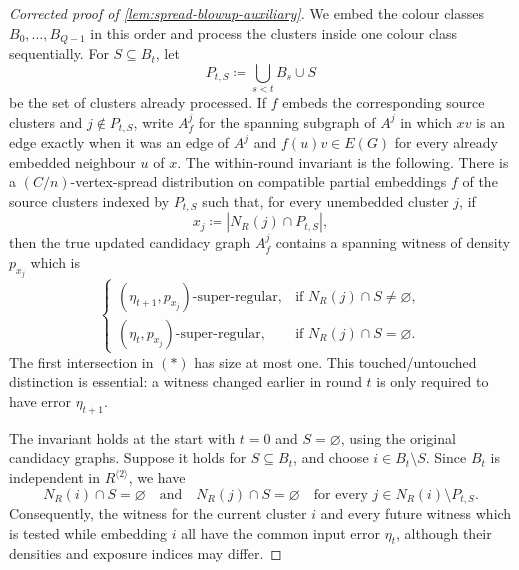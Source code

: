 \begin{proof}[Corrected proof of \cref{lem:spread-blowup-auxiliary}]
We embed the colour classes $B_0,\dots,B_{Q-1}$ in this order and process the
clusters inside one colour class sequentially.  For
$S\subseteq B_t$, let
\[
    P_{t,S}
        \coloneqq \bigcup_{s<t}B_s\cup S
\]
be the set of clusters already processed.  If $f$ embeds the corresponding
source clusters and $j\notin P_{t,S}$, write $A_f^j$ for the spanning
subgraph of $A^j$ in which $xv$ is an edge exactly when it was an edge of
$A^j$ and $f(u)v\in E(G)$ for every already embedded neighbour $u$ of $x$.
The within-round invariant is the following.  There is a
$(C/n)$-vertex-spread distribution on compatible
partial embeddings $f$ of the source clusters indexed by $P_{t,S}$ such that,
for every unembedded cluster $j$, if
\[
    x_j\coloneqq |N_R(j)\cap P_{t,S}|,
\]
then the true updated candidacy graph $A_f^j$ contains a spanning witness of
density $p_{x_j}$ which is
\[
    \begin{cases}
      (\eta_{t+1},p_{x_j})\text{-super-regular},
        &\text{if }N_R(j)\cap S\neq\varnothing,\\
      (\eta_t,p_{x_j})\text{-super-regular},
        &\text{if }N_R(j)\cap S=\varnothing.
    \end{cases}                                      \tag{*}
\]
The first intersection in $(*)$ has size at most one.  This touched/untouched
distinction is essential: a witness changed earlier in round $t$ is only
required to have error $\eta_{t+1}$.

The invariant holds at the start with $t=0$ and $S=\varnothing$, using the
original candidacy graphs.  Suppose it holds for $S\subseteq B_t$, and choose
$i\in B_t\setminus S$.  Since $B_t$ is independent in
$R^{\langle 2\rangle}$, we have
\[
    N_R(i)\cap S=\varnothing
    \quad\text{and}\quad
    N_R(j)\cap S=\varnothing
        \quad\text{for every }j\in N_R(i)\setminus P_{t,S}.
\]
Consequently, the witness for the current cluster $i$ and every future
witness which is tested while embedding $i$ all have the common input error
$\eta_t$, although their densities and exposure indices may differ.


\end{proof}
